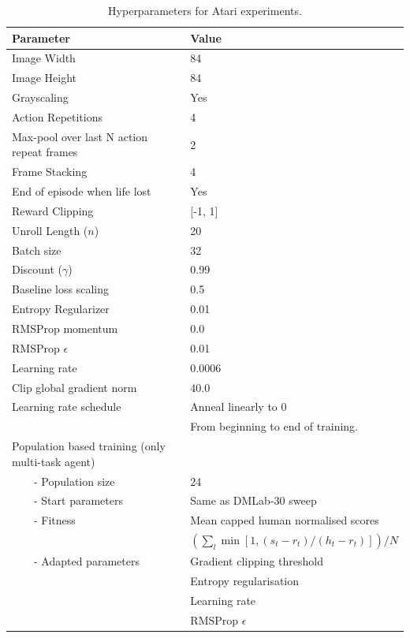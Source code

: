 \begin{table}[H]
\begin{center}
\begin{tabular}{l@{\hspace{.22cm}}l@{\hspace{.22cm}}}
\toprule
\textbf{Parameter} & \textbf{Value}  \\
\midrule
Image Width & 84 \\
Image Height & 84 \\
Grayscaling & Yes \\
Action Repetitions & 4 \\
Max-pool over last N action repeat frames & 2 \\
Frame Stacking & 4 \\
End of episode when life lost & Yes \\
Reward Clipping & [-1, 1] \\
Unroll Length ($n$) & 20 \\
Batch size & 32 \\
Discount ($\gamma$) & 0.99 \\
Baseline loss scaling & 0.5 \\
Entropy Regularizer & 0.01 \\
RMSProp momentum & 0.0 \\
RMSProp $\epsilon$ & 0.01 \\
Learning rate & 0.0006 \\
Clip global gradient norm & 40.0 \\
Learning rate schedule & Anneal linearly to 0 \\
                       & From beginning to end of training. \\
Population based training (only multi-task agent) & \\
\ \ \ \ - Population size & 24 \\
\ \ \ \ - Start parameters & Same as DMLab-30 sweep \\
\ \ \ \ - Fitness & Mean capped human normalised scores \\
                  & $\left(\sum_l \min\left[1, (s_t - r_t) / (h_t - r_t)\right]\right) / N$ \\
\ \ \ \ - Adapted parameters & Gradient clipping threshold \\
                             & Entropy regularisation \\
                             & Learning rate \\
                             & RMSProp $\epsilon$ \\
      \bottomrule
\end{tabular}
\end{center}
\caption{Hyperparameters for Atari experiments.}
\label{tab:fixed_model_hyperparameters_atari}
\end{table}